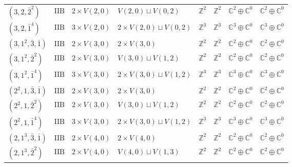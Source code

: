 \documentclass[11pt,a4paper]{article}
\begin{document}
\begin{appendix}
\begin{table}
\begin{tabular}{C{2.65cm}C{0.85cm}C{3.0cm}C{3.0cm}C{2.25cm}C{2.25cm}C{1.55cm}C{1.55cm}}
\((3, 2, \bar{2}^{2})\) & \(\mathrm{IIB}\) & \(2 \times V(2,0)\) & \(V(2,0) \sqcup V(0,2)\) & \(\mathbb{Z}^{2}\) & \(\mathbb{Z}^{2}\) & \(\mathbb{C}^{2} \oplus \mathbb{C}^{0}\) & \(\mathbb{C}^{2} \oplus \mathbb{C}^{0}\) \\
\((3, 2, \bar{1}^{4})\) & \(\mathrm{IIB}\) & \(3 \times V(2,0)\) & \(2 \times V(2,0) \sqcup V(0,2)\) & \(\mathbb{Z}^{3}\) & \(\mathbb{Z}^{3}\) & \(\mathbb{C}^{3} \oplus \mathbb{C}^{0}\) & \(\mathbb{C}^{3} \oplus \mathbb{C}^{0}\) \\
\((3, 1^{2}, \bar{3}, \bar{1})\) & \(\mathrm{IIB}\) & \(2 \times V(3,0)\) & \(2 \times V(3,0)\) & \(\mathbb{Z}^{2}\) & \(\mathbb{Z}^{2}\) & \(\mathbb{C}^{2} \oplus \mathbb{C}^{0}\) & \(\mathbb{C}^{2} \oplus \mathbb{C}^{0}\) \\
\((3, 1^{2}, \bar{2}^{2})\) & \(\mathrm{IIB}\) & \(2 \times V(3,0)\) & \(V(3,0) \sqcup V(1,2)\) & \(\mathbb{Z}^{2}\) & \(\mathbb{Z}^{2}\) & \(\mathbb{C}^{2} \oplus \mathbb{C}^{0}\) & \(\mathbb{C}^{2} \oplus \mathbb{C}^{0}\) \\
\((3, 1^{2}, \bar{1}^{4})\) & \(\mathrm{IIB}\) & \(3 \times V(3,0)\) & \(2 \times V(3,0) \sqcup V(1,2)\) & \(\mathbb{Z}^{3}\) & \(\mathbb{Z}^{3}\) & \(\mathbb{C}^{3} \oplus \mathbb{C}^{0}\) & \(\mathbb{C}^{3} \oplus \mathbb{C}^{0}\) \\
\((2^{2}, 1, \bar{3}, \bar{1})\) & \(\mathrm{IIB}\) & \(2 \times V(3,0)\) & \(2 \times V(3,0)\) & \(\mathbb{Z}^{2}\) & \(\mathbb{Z}^{2}\) & \(\mathbb{C}^{2} \oplus \mathbb{C}^{0}\) & \(\mathbb{C}^{2} \oplus \mathbb{C}^{0}\) \\
\((2^{2}, 1, \bar{2}^{2})\) & \(\mathrm{IIB}\) & \(2 \times V(3,0)\) & \(V(3,0) \sqcup V(1,2)\) & \(\mathbb{Z}^{2}\) & \(\mathbb{Z}^{2}\) & \(\mathbb{C}^{2} \oplus \mathbb{C}^{0}\) & \(\mathbb{C}^{2} \oplus \mathbb{C}^{0}\) \\
\((2^{2}, 1, \bar{1}^{4})\) & \(\mathrm{IIB}\) & \(3 \times V(3,0)\) & \(2 \times V(3,0) \sqcup V(1,2)\) & \(\mathbb{Z}^{3}\) & \(\mathbb{Z}^{3}\) & \(\mathbb{C}^{3} \oplus \mathbb{C}^{0}\) & \(\mathbb{C}^{3} \oplus \mathbb{C}^{0}\) \\
\((2, 1^{3}, \bar{3}, \bar{1})\) & \(\mathrm{IIB}\) & \(2 \times V(4,0)\) & \(2 \times V(4,0)\) & \(\mathbb{Z}^{2}\) & \(\mathbb{Z}^{2}\) & \(\mathbb{C}^{2} \oplus \mathbb{C}^{0}\) & \(\mathbb{C}^{2} \oplus \mathbb{C}^{0}\) \\
\((2, 1^{3}, \bar{2}^{2})\) & \(\mathrm{IIB}\) & \(2 \times V(4,0)\) & \(V(4,0) \sqcup V(1,3)\) & \(\mathbb{Z}^{2}\) & \(\mathbb{Z}^{2}\) & \(\mathbb{C}^{2} \oplus \mathbb{C}^{0}\) & \(\mathbb{C}^{2} \oplus \mathbb{C}^{0}\) \\

\end{tabular}
\end{table}
\end{appendix}
\end{document}
